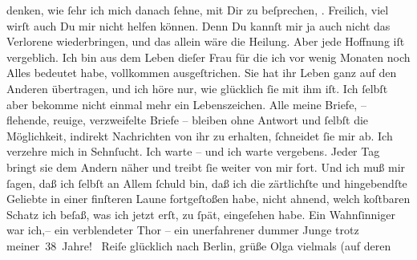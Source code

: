 \begin{ledgroupsized}[t]{13cm}
               denken, wie ſehr ich mich danach ſehne, mit Dir zu beſprechen, \label{K_L03363-3v}\label{K_L03363-3h}.
               Freilich, viel wirſt auch Du mir nicht helfen können. {\pb}Denn Du kannſt mir ja auch nicht das Verlorene
               wiederbringen, und das allein wäre die Heilung. Aber jede Hoffnung iſt vergeblich.
               Ich bin aus dem Leben dieſer Frau für die ich vor wenig Monaten noch Alles
               bedeutet habe, vollkommen ausgeſtrichen. Sie hat ihr Leben ganz auf den Anderen übertragen, und ich
               höre nur, wie glücklich ſie mit ihm iſt. Ich ſelbſt aber bekomme nicht einmal mehr
               ein Lebenszeichen. Alle meine Briefe, – flehende, reuige, verzweifelte Briefe – {\pb}bleiben ohne Antwort und ſelbſt die Möglichkeit,
               indirekt Nachrichten\strikeout{\textcolor{gray}{×}} von ihr zu erhalten, ſchneidet ſie mir ab. Ich verzehre mich in Sehnſucht. Ich warte – und
               ich warte vergebens. Jeder Tag bringt sie dem Andern näher und treibt ſie weiter von mir fort. Und ich
               muß mir ſagen, daß ich ſelbſt an Allem ſchuld \introOben{}bin\introOben{}, daß ich
               die zärtlichſte und hingebendſte Geliebte in einer finſteren Laune fortgeſtoßen habe,
               nicht ahnend, {\pb}welch koſtbaren Schatz ich beſaß, was
               ich jetzt erſt, zu ſpät, eingeſehen habe. Ein Wahnſinniger war ich,– ein verblendeter
               Thor – ein unerfahrener dummer Junge trotz meiner 38 Jahre! {\dotsfour}\pend
           \pstart
           Reiſe glücklich nach Berlin, grüße Olga vielmals (auf deren \label{K_L03363-4v}
\end{ledgroupsized}
